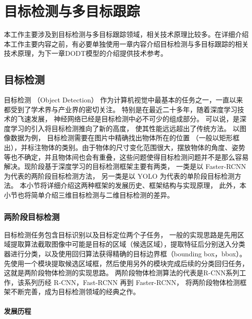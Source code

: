 \chapter{目标检测与多目标跟踪}
\label{technologies}
本工作主要涉及到目标检测与多目标跟踪领域，相关技术原理比较多。在详细介绍本工作主要内容之前，有必要单独使用一章内容介绍目标检测与多目标跟踪的相关技术原理，为下一章DODT模型的介绍提供技术参考。

\section{目标检测}
\label{object_detection}
目标检测 （Object Detection） 作为计算机视觉中最基本的任务之一，一直以来都受到了学术界与产业界的密切关注。 特别是在最近二十多年，随着深度学习技术的飞速发展， 神经网络已经是目标检测中必不可少的组成部分。 可以说，是深度学习的引入将目标检测推向了新的高度， 使其性能远远超出了传统方法。 以图像数据为例， 目标检测需要在图片中精确找出物体所在的位置 （一般以矩形框出），并标注物体的类别。由于物体的尺寸变化范围很大，摆放物体的角度、姿势等也不确定，并且物体间也会有重叠，这些问题使得目标检测问题并不是那么容易解决。现阶段基于深度学习的目标检测框架主要有两类， 一类是以 Faster-RCNN\cite{ren2015faster} 为代表的两阶段目标检测方法， 另一类是以 YOLO\cite{redmon2016you} 为代表的单阶段目标检测方法。 本小节将详细介绍这两种框架的发展历史、框架结构与实现原理， 此外，本小节也将简单介绍三维目标检测与二维目标检测的差异。

\subsection{两阶段目标检测}
\label{two-stage}
目标检测任务包含目标识别以及目标定位两个子任务， 一般的实现思路是先用区域提取算法截取图像中可能是目标的区域（候选区域），提取特征后分别送入分类器进行分类，以及使用回归算法获得精确的目标边界框（bounding box，bbox）。 先使用一个模块提取候选区域框，然后使用另外的模块完成后续的分类回归任务，这就是两阶段物体检测的实现思路。 两阶段物体检测算法的代表是R-CNN系列工作，该系列历经 R-CNN\cite{6909475}，Fast-RCNN\cite{girshick2015fast} 再到 Faster-RCNN\cite{ren2015faster}， 将两阶段物体检测框架不断完善，成为目标检测领域的经典之作。 

\subsubsection{发展历程}




